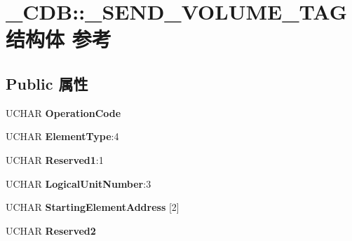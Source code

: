 \hypertarget{struct___c_d_b_1_1___s_e_n_d___v_o_l_u_m_e___t_a_g}{}\section{\+\_\+\+C\+DB\+:\+:\+\_\+\+S\+E\+N\+D\+\_\+\+V\+O\+L\+U\+M\+E\+\_\+\+T\+A\+G结构体 参考}
\label{struct___c_d_b_1_1___s_e_n_d___v_o_l_u_m_e___t_a_g}
\subsection*{Public 属性}
\begin{DoxyCompactItemize}
\item 
\mbox{\label{struct___c_d_b_1_1___s_e_n_d___v_o_l_u_m_e___t_a_g_a3a7dcd95c7e179a06054440e93679f72}} 
U\+C\+H\+AR {\bfseries Operation\+Code}
\item 
\mbox{\label{struct___c_d_b_1_1___s_e_n_d___v_o_l_u_m_e___t_a_g_aeecc909fc1cd002324612df6e7e520bc}} 
U\+C\+H\+AR {\bfseries Element\+Type}\+:4
\item 
\mbox{\label{struct___c_d_b_1_1___s_e_n_d___v_o_l_u_m_e___t_a_g_acce1634888f58c4256697d18c4bce6ac}} 
U\+C\+H\+AR {\bfseries Reserved1}\+:1
\item 
\mbox{\label{struct___c_d_b_1_1___s_e_n_d___v_o_l_u_m_e___t_a_g_a9ab1923b4c08319282a2573fc6f74716}} 
U\+C\+H\+AR {\bfseries Logical\+Unit\+Number}\+:3
\item 
\mbox{\label{struct___c_d_b_1_1___s_e_n_d___v_o_l_u_m_e___t_a_g_a947f4fef77ccab40b7e7b0dec1dca8d7}} 
U\+C\+H\+AR {\bfseries Starting\+Element\+Address} \mbox{[}2\mbox{]}
\item 
\mbox{\label{struct___c_d_b_1_1___s_e_n_d___v_o_l_u_m_e___t_a_g_a0fe47ca026f4eca9e4b506c7c336d423}} 
U\+C\+H\+AR {\bfseries Reserved2}
\item 
\mbox{\label{struct___c_d_b_1_1___s_e_n_d___v_o_l_u_m_e___t_a_g_a5233ccc09a8f51d1f048746c934da577}} 

\end{DoxyCompactItemize}
